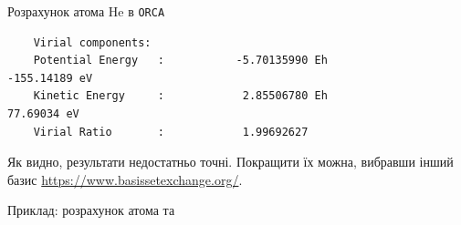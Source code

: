 \documentclass[10pt]{beamer}
\begin{document}
\begin{frame}[fragile]{Розрахунок атома He в \texttt{ORCA}}
\begin{onlyenv}
{\begin{verbatim}
    Virial components:
    Potential Energy   :           -5.70135990 Eh            -155.14189 eV
    Kinetic Energy     :            2.85506780 Eh              77.69034 eV
    Virial Ratio       :            1.99692627
            \end{verbatim}
		}

		{\small Як видно, результати недостатньо точні. Покращити їх можна, вибравши інший базис \url{https://www.basissetexchange.org/}.}

		Приклад: розрахунок атома  \href{https://www.youtube.com/watch?v=wGWfPfClFWQ}{} та  \href{https://www.youtube.com/watch?v=QINMAkm8mXs}{}
	\end{onlyenv}
\end{frame}
\end{document}
